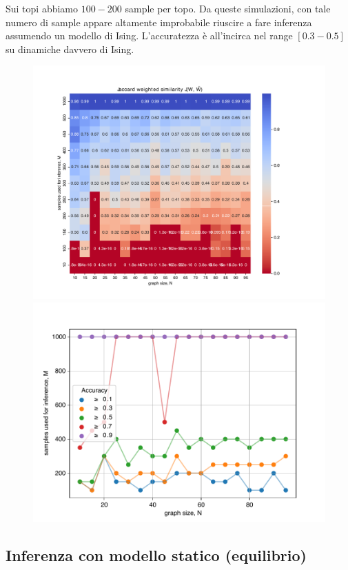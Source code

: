 \documentclass{article}
\begin{document}
Sui topi abbiamo $100- 200$ sample per topo. Da queste simulazioni, con tale numero di sample appare altamente improbabile riuscire a fare inferenza assumendo un modello di Ising. L'accuratezza è all'incirca nel range $[0.3 - 0.5]$ su dinamiche davvero di Ising.
\begin{figure}[H]
    \centering
\includegraphics[width=0.8\linewidth]{images/sbm_ising_heatmap_small.pdf}
    \includegraphics[width=0.6\linewidth]{images/sbm_ising_contour_small.pdf}
    \caption{}
\end{figure}


\subsection{Inferenza con modello statico (equilibrio)}
\end{document}
